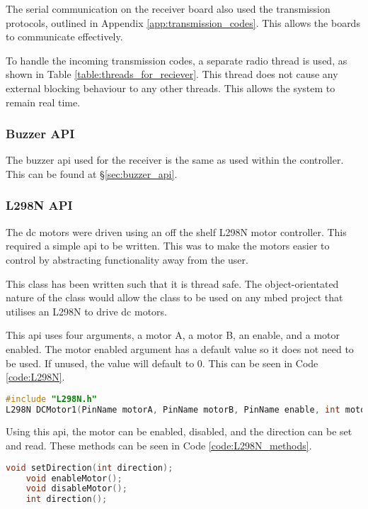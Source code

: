 \documentclass [12pt]{article}
\begin{document}
The serial communication on the receiver board also used the transmission protocols, outlined in Appendix \ref{app:transmission_codes}. This allows the boards to communicate effectively.

To handle the incoming transmission codes, a separate radio thread is used, as shown in Table \ref{table:threads_for_reciever}. This thread does not cause any external blocking behaviour to any other threads. This allows the system to remain real time. 

\subsubsection{Buzzer API}

The buzzer \gls{api} used for the receiver is the same as used within the controller. This can be found at §\ref{sec:buzzer_api}.

\subsubsection{L298N API}

The \gls{dc} motors were driven using an off the shelf L298N motor controller. This required a simple \gls{api} to be written. This was to make the motors easier to control by abstracting functionality away from the user. 

This class has been written such that it is thread safe. The object-orientated nature of the class would allow the class to be used on any \gls{mbed} project that utilises an L298N to drive \gls{dc} motors. 

This \gls{api} uses four arguments, a motor A, a motor B, an enable, and a motor enabled. The motor enabled argument has a default value so it does not need to be used. If unused, the value will default to 0. This can be seen in Code \ref{code:L298N}.

\begin{lstlisting}[language=C++,label=code:L298N,caption=L298N Class Constructor]
#include "L298N.h"
L298N DCMotor1(PinName motorA, PinName motorB, PinName enable, int motorEnabled = 0);
\end{lstlisting} 

Using this \gls{api}, the motor can be enabled, disabled, and the direction can be set and read. These methods can be seen in Code \ref{code:L298N_methods}.

\begin{lstlisting}[language=C++,label=code:L298N_methods,caption=L298N Class Methods]
    void setDirection(int direction);
    void enableMotor();
    void disableMotor();
    int direction();
\end{lstlisting}
\end{document}
